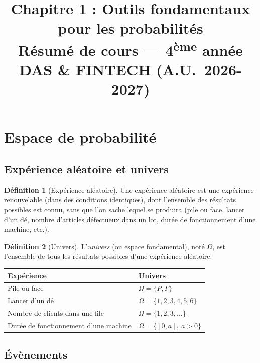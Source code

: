 \documentclass[11pt,a4paper]{article}
\title{\textbf{Chapitre 1 : Outils fondamentaux pour les probabilités}\\[4pt]
\large Résumé de cours --- 4\textsuperscript{ème} année DAS \& FINTECH (A.U.\ 2026-2027)}
\date{}
\author{}
\newcommand{\1}{\mathbf{1}}
\theoremstyle{definition}
\newtheorem*{definition}{Définition}
\theoremstyle{plain}
\theoremstyle{remark}
\begin{document}
\maketitle
\tableofcontents
\newpage

\section{Espace de probabilité}

\subsection{Expérience aléatoire et univers}

\begin{definition}[Expérience aléatoire]
Une expérience aléatoire est une expérience renouvelable (dans des conditions identiques), dont l'ensemble des résultats possibles est connu, sans que l'on sache lequel se produira (pile ou face, lancer d'un dé, nombre d'articles défectueux dans un lot, durée de fonctionnement d'une machine, etc.).
\end{definition}

\begin{definition}[Univers]
L'\emph{univers} (ou espace fondamental), noté $\Omega$, est l'ensemble de tous les résultats possibles d'une expérience aléatoire.
\end{definition}

\begin{center}
\begin{tabular}{ll}
\toprule
\textbf{Expérience} & \textbf{Univers}\\
\midrule
Pile ou face & $\Omega=\{P,F\}$\\
Lancer d'un dé & $\Omega=\{1,2,3,4,5,6\}$\\
Nombre de clients dans une file & $\Omega=\{1,2,3,\dots\}$\\
Durée de fonctionnement d'une machine & $\Omega=\{[0,a],\ a>0\}$\\
\bottomrule
\end{tabular}
\end{center}

\subsection{Évènements}
\end{document}

